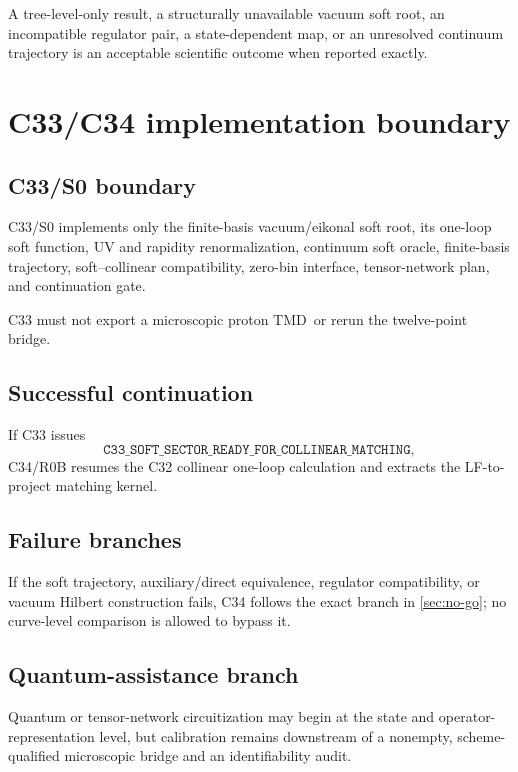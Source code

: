 \documentclass[11pt]{article}
\newcommand{\TMD}{\ensuremath{\mathrm{TMD}}}
\begin{document}
A tree-level-only result, a structurally unavailable vacuum soft root, an incompatible regulator pair, a state-dependent map, or an unresolved continuum trajectory is an acceptable scientific outcome when reported exactly.

\section{C33/C34 implementation boundary}
\label{sec:handoff}

\subsection{C33/S0 boundary}

C33/S0 implements only the finite-basis vacuum/eikonal soft root, its one-loop soft function, UV and rapidity renormalization, continuum soft oracle, finite-basis trajectory, soft--collinear compatibility, zero-bin interface, tensor-network plan, and continuation gate.

C33 must not export a microscopic proton \TMD\ or rerun the twelve-point bridge.

\subsection{Successful continuation}

If C33 issues
\begin{equation}
 \texttt{C33\_SOFT\_SECTOR\_READY\_FOR\_COLLINEAR\_MATCHING},
 \label{eq:c33-continuation}
\end{equation}
C34/R0B resumes the C32 collinear one-loop calculation and extracts the LF-to-project matching kernel.

\subsection{Failure branches}

If the soft trajectory, auxiliary/direct equivalence, regulator compatibility, or vacuum Hilbert construction fails, C34 follows the exact branch in \cref{sec:no-go}; no curve-level comparison is allowed to bypass it.

\subsection{Quantum-assistance branch}

Quantum or tensor-network circuitization may begin at the state and operator-representation level, but calibration remains downstream of a nonempty, scheme-qualified microscopic bridge and an identifiability audit.
\end{document}
